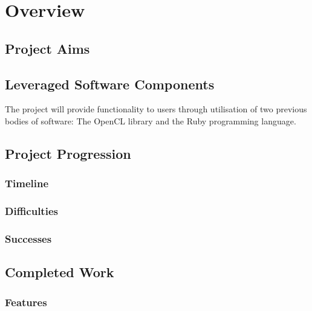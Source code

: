 \chapter{Overview}

\section{Project Aims}


\section{Leveraged Software Components}
The project will provide functionality to users through utilisation of two previous bodies of software: The \ac{OpenCL} library and the Ruby programming language.





\section{Project Progression}
\subsection{Timeline}

\subsection{Difficulties}

\subsection{Successes}

\section{Completed Work}
\subsection{Features}

